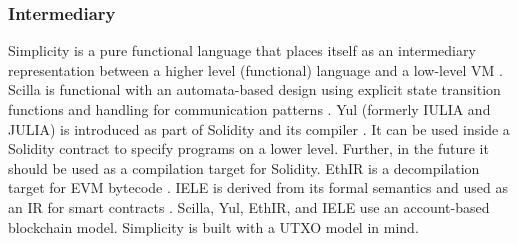 \subsubsection{Intermediary}
Simplicity is a pure functional language that places itself as an intermediary representation between a higher level (functional) language and a low-level VM \cite{OConnor2017}. 
Scilla is functional with an automata-based design using explicit state transition functions and handling for communication patterns \cite{Sergey2018}. 
Yul (formerly IULIA and JULIA) is introduced as part of Solidity and its compiler \cite{EthereumFoundation2018IULIA}. 
It can be used inside a Solidity contract to specify programs on a lower level. Further, in the future it should be used as a compilation target for Solidity.
EthIR is a decompilation target for EVM bytecode \cite{Albert2018}. 
IELE is derived from its formal semantics and used as an IR for smart contracts \cite{Kasampalis2018}. 
Scilla, Yul, EthIR, and IELE use an account-based blockchain model. Simplicity is built with a UTXO model in mind.

